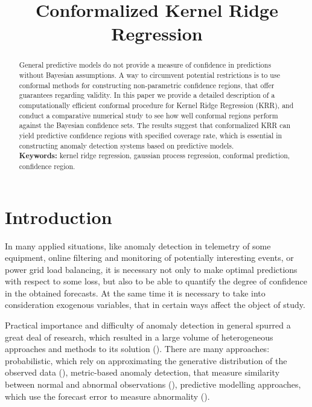 \documentclass[conference]{IEEEtran}
\title{Conformalized Kernel Ridge Regression}
\author{
\IEEEauthorblockN{
Burnaev\IEEEauthorrefmark{1}, E. V.,
Nazarov\IEEEauthorrefmark{2}, I. N.}
\IEEEauthorblockA{
\IEEEauthorrefmark{1}IITP RAS, Skoltech, e.burnaev@skoltech.ru}
\IEEEauthorblockA{\IEEEauthorrefmark{2} IITP RAS, ivan.nazarov@iitp.ru}
}
\begin{document}
\maketitle

\begin{abstract}
General predictive models do not provide a measure of confidence in predictions
without Bayesian assumptions. A way to circumvent potential restrictions is to
use conformal methods for constructing non-parametric confidence regions, that
offer guarantees regarding validity. In this paper we provide a detailed description
of a computationally efficient conformal procedure for Kernel Ridge Regression (KRR),
and conduct a comparative numerical study to see how well conformal regions perform
against the Bayesian confidence sets. The results suggest that conformalized KRR
can yield predictive confidence regions with specified coverage rate, which is
essential in constructing anomaly detection systems based on predictive models.\\
\textbf{Keywords:} kernel ridge regression, gaussian process regression,
conformal prediction, confidence region.
\end{abstract}


\section{Introduction} %
\label{sec:introduction}

In many applied situations, like anomaly detection in telemetry of some equipment,
online filtering and monitoring of potentially interesting events, or power grid
load balancing, it is necessary not only to make optimal predictions with respect
to some loss, but also to be able to quantify the degree of confidence in the obtained
forecasts. At the same time it is necessary to take into consideration exogenous
variables, that in certain ways affect the object of study. 

Practical importance and difficulty of anomaly detection in general spurred a great
deal of research, which resulted in a large volume of heterogeneous approaches and
methods to its solution (\cite{Alestra2014, Burnaev2015, Artemov2015}). There are
many approaches: probabilistic, which rely on approximating the generative distribution
of the observed data (\cite{aggarwal2008, scott2008}), metric-based anomaly detection,
that measure similarity between normal and abnormal observations (\cite{hautamaki2004,
breunig2000, kriegel2009}), predictive modelling approaches, which use the forecast
error to measure abnormality (\cite{augusteijn2002, hawkins2002, hoffmann2007, scholkopf1998}).
\end{document}
